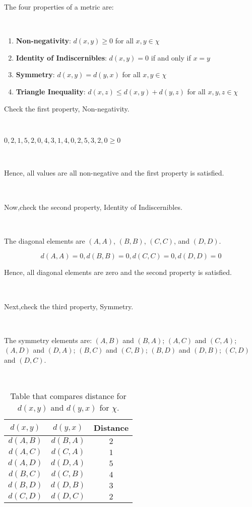 \documentclass{article}
\begin{document}
\parbox{\textwidth}{The four properties of a metric are:}\\

\begin{enumerate}
    \item \textbf{Non-negativity}: $d(x,y) \geq 0$ for all $x,y \in \chi$
    \item \textbf{Identity of Indiscernibles}: $d(x,y) = 0$ if and only if $x = y$
    \item \textbf{Symmetry}: $d(x,y) = d(y,x)$ for all $x,y \in \chi$
    \item \textbf{Triangle Inequality}: $d(x,z) \leq d(x,y) + d(y,z)$ for all $x,y,z \in \chi$
\end{enumerate}

\parbox{\textwidth}{Check the first property, Non-negativity.}\\

\parbox{\textwidth}{$0,2,1,5,2,0,4,3,1,4,0,2,5,3,2,0 \geq 0$}\\

\parbox{\textwidth}{Hence, all values are all non-negative and the first property is satisfied.}\\

\parbox{\textwidth}{Now,check the second property, Identity of Indiscernibles.}\\

\parbox{\textwidth}{The diagonal elements are $(A,A)$, $(B,B)$, $(C,C)$, and $(D,D)$.}

$$d(A,A) = 0 , d(B,B) = 0 , d(C,C) = 0 , d(D,D) = 0$$

\parbox{\textwidth}{Hence, all diagonal elements are zero and the second property is satisfied.}\\

\parbox{\textwidth}{Next,check the third property, Symmetry.}\\

\parbox{\textwidth}{The symmetry elements are: $(A,B)$ and $(B,A)$; $(A,C)$ and $(C,A)$; $(A,D)$ and $(D,A)$; $(B,C)$ and $(C,B)$; $(B,D)$ and $(D,B)$; $(C,D)$ and $(D,C)$.}\\

\begin{table}[h]
\centering
\begin{tabular}{|c|c|c|}
\hline
$d(x,y)$ & $d(y,x)$ & Distance \\
\hline
$d(A,B)$ & $d(B,A)$  & $2$ \\
$d(A,C)$ & $d(C,A)$  & $1$ \\
$d(A,D)$ & $d(D,A)$  & $5$ \\
$d(B,C)$ & $d(C,B)$  & $4$ \\
$d(B,D)$ & $d(D,B)$  & $3$ \\
$d(C,D)$ & $d(D,C)$  & $2$ \\
\hline
\end{tabular}
\caption{Table that compares distance for $d(x,y)$ and $d(y,x)$ for $\chi$.}
\label{tab:solution}
\end{table}
\end{document}
